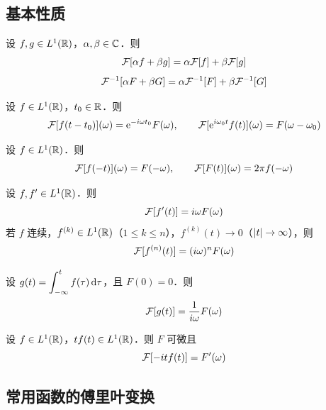 \documentclass[12pt, a4paper, oneside, UTF8]{ctexbook}
\begin{document}
\subsection{基本性质}

\begin{theorem}[线性性]
    设 $f,g\in L^1(\mathbb{R})$，$\alpha,\beta\in\mathbb{C}$．则
    \[
        \mathcal{F}[\alpha f + \beta g] = \alpha\mathcal{F}[f] + \beta\mathcal{F}[g]
    \]
    \[
        \mathcal{F}^{-1}[\alpha F + \beta G] = \alpha\mathcal{F}^{-1}[F] + \beta\mathcal{F}^{-1}[G]
    \]
\end{theorem}

\begin{theorem}[位移性质]
    设 $f\in L^1(\mathbb{R})$，$t_0\in\mathbb{R}$．则
    \[
        \mathcal{F}[f(t-t_0)](\omega) = \mathrm{e}^{-i\omega t_0}F(\omega),\qquad
        \mathcal{F}[\mathrm{e}^{i\omega_0 t} f(t)](\omega) = F(\omega-\omega_0)
    \]
\end{theorem}

\begin{theorem}[对称性质]
    设 $f\in L^1(\mathbb{R})$．则
    \[
        \mathcal{F}[f(-t)](\omega) = F(-\omega),\qquad
        \mathcal{F}[F(t)](\omega) = 2\pi f(-\omega)
    \]
\end{theorem}

\begin{theorem}[微分性质]
    设 $f,f'\in L^1(\mathbb{R})$．则
    \[
        \mathcal{F}[f'(t)] = i\omega F(\omega)
    \]
    若 $f$ 连续，$f^{(k)}\in L^1(\mathbb{R})$（$1\le k\le n$），$f^{(k)}(t)\to 0$（$\abs{t}\to\infty$），则
    \[
        \mathcal{F}[f^{(n)}(t)] = (i\omega)^n F(\omega)
    \]
\end{theorem}

\begin{theorem}[积分性质]
    设 $g(t) = \displaystyle\int_{-\infty}^{t} f(\tau)\,\mathrm{d}\tau$，且 $F(0)=0$．则
    \[
        \mathcal{F}[g(t)] = \frac{1}{i\omega}F(\omega)
    \]
\end{theorem}

\begin{theorem}[乘 $t^n$ 性质]
    设 $f\in L^1(\mathbb{R})$，$tf(t)\in L^1(\mathbb{R})$．则 $F$ 可微且
    \[
        \mathcal{F}[-it f(t)] = F'(\omega)
    \]
\end{theorem}

\subsection{常用函数的傅里叶变换}
\end{document}
